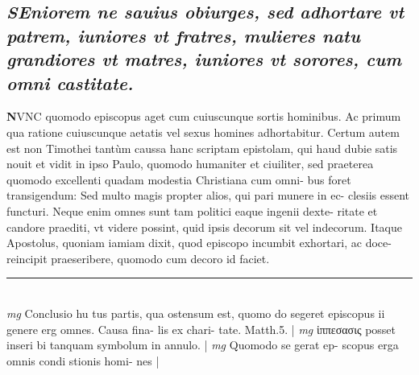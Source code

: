 \documentclass{article}
\begin{document}
\begin{pages}
\subsection*{\textit{\huge\textbf{S}\normalsize Eniorem ne sauius obiurges, sed adhortare vt patrem, iuniores vt fratres, mulieres natu grandiores vt matres, iuniores vt sorores, cum omni castitate. }}\pstart \huge\textbf{N}\normalsize VNC quomodo episcopus aget cum cuiuscunque sortis hominibus. Ac primum qua ratione cuiuscunque aetatis vel sexus homines adhortabitur. Certum autem est non Timothei tantùm caussa hanc scriptam epistolam, qui haud dubie satis nouit et vidit in ipso Paulo, quomodo humaniter et ciuiliter, sed praeterea quomodo excellenti quadam modestia Christiana cum omni- bus foret transigendum: Sed multo magis propter alios, qui pari munere in ec- clesiis essent functuri. Neque enim omnes sunt tam politici eaque ingenii dexte- ritate et candore praediti, vt videre possint, quid ipsis decorum sit vel indecorum. Itaque Apostolus, quoniam iamiam dixit, quod episcopo incumbit exhortari, ac doce- reincipit praeseribere, quomodo cum decoro id faciet.  \pend
\vspace{0.5cm}\noindent
\vspace{0.2cm}\rule{1cm}{0.2pt}\\ 
\hspace{0.2cm}\textit{mg}
\footnotesize Conclusio hu tus partis, qua ostensum est, quomo do segeret episcopus ii genere erg omnes. Causa fina- lis ex chari- tate. Matth.5. 
\normalsize| 
\hspace{0.2cm}\textit{mg}
\footnotesize ἱππεσασις posset inseri bi tanquam symbolum in annulo. 
\normalsize| 
\hspace{0.2cm}\textit{mg}
\footnotesize Quomodo se gerat ep- scopus erga omnis condi stionis homi- nes 
\normalsize| 

\end{pages}
\end{document}
